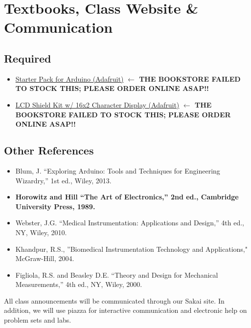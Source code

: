 \section{Textbooks, Class Website \& Communication}

\subsection{Required}
\begin{itemize}
    \item \href{http://www.adafruit.com/products/68}{Starter Pack for Arduino (Adafruit)} \textbf{$\leftarrow$ THE BOOKSTORE FAILED TO STOCK THIS; PLEASE ORDER ONLINE ASAP!!}
    \item \href{http://www.adafruit.com/products/772}{LCD Shield Kit w/ 16x2 Character Display (Adafruit)} \textbf{$\leftarrow$ THE BOOKSTORE FAILED TO STOCK THIS; PLEASE ORDER ONLINE ASAP!!}

\end{itemize}


\subsection{Other References}
\begin{itemize}
    \item Blum, J. ``Exploring Arduino: Tools and Techniques for Engineering
        Wizardry,'' 1st ed., Wiley, 2013.
\item \textbf{Horowitz and Hill ``The Art of Electronics,'' 2nd ed., Cambridge
University Press, 1989.}
\item Webster, J.G. ``Medical Instrumentation: Applications and Design,'' 4th
ed., NY, Wiley, 2010.
\item Khandpur, R.S., ''Biomedical Instrumentation Technology and Applications,"
McGraw-Hill, 2004.
\item Figliola, R.S. and Beasley D.E. ``Theory and Design for Mechanical
Measurements,'' 4th ed., NY, Wiley, 2000.
\end{itemize}

All class announcements will be communicated through our Sakai site. 
In addition, we will use piazza for interactive communication and 
electronic help on problem sets and labs.
